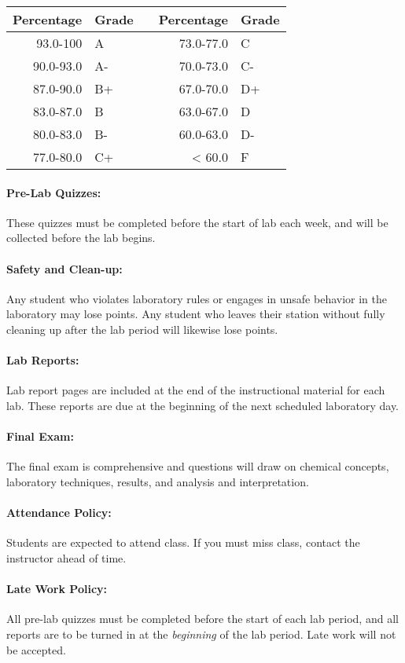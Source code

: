 \documentclass[12pt, letterpaper]{article}
\begin{document}
\begin{tabular}{rl|c|rl}
	Percentage & Grade &  & Percentage & Grade \\ \midrule
	93.0-100   & A     &  & 73.0-77.0  & C     \\
	90.0-93.0  & A-    &  & 70.0-73.0  & C-    \\
	87.0-90.0  & B+    &  & 67.0-70.0  & D+    \\
	83.0-87.0  & B     &  & 63.0-67.0  & D     \\
	80.0-83.0  & B-    &  & 60.0-63.0  & D-    \\
	77.0-80.0  & C+    &  & < 60.0     & F
\end{tabular}
\paragraph{Pre-Lab Quizzes:}
These quizzes must be completed before the start of lab each week, and will be collected before the lab begins.

\paragraph{Safety and Clean-up:}
Any student who violates laboratory rules or engages in unsafe behavior in the laboratory may lose points. Any student who leaves their station without fully cleaning up after the lab period will likewise lose points.

\paragraph{Lab Reports:}
Lab report pages are included at the end of the instructional material for each lab. These reports are due at the beginning of the next scheduled laboratory day.

\paragraph{Final Exam:}
The final exam is comprehensive and questions will draw on chemical concepts, laboratory techniques, results, and analysis and interpretation.

\paragraph{Attendance Policy:}
Students are expected to attend class. If you must miss class, contact the instructor ahead of time.

\paragraph{Late Work Policy:}
All pre-lab quizzes must be completed before the start of each lab period, and all reports are to be turned in at the \emph{beginning} of the lab period. Late work will not be accepted.
\end{document}

